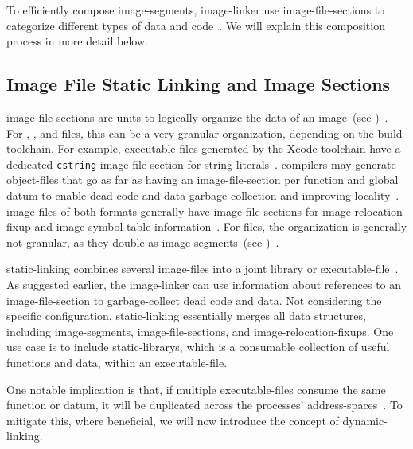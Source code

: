 To efficiently compose \glspl{image-segment}, \gls{image-linker} use \glspl{image-file-section} to categorize different types of data and code~\cite{levine2000linkers}. We will explain this composition process in more detail below.

\subsection{Image File Static Linking and Image Sections}
\label{sec:sections}

\Glspl{image-file-section} are units to logically organize the data of an \gls{image}~(see )~\cite{elf-spec,macho-spec,pe-format,levine2000linkers}. For , , and  files, this can be a very granular organization, depending on the build toolchain. For example,  \glspl{executable-file} generated by the  Xcode toolchain have a dedicated \texttt{cstring} \gls{image-file-section} for string literals~\cite{macho-spec}.  compilers may generate \glspl{object-file} that go as far as having an \gls{image-file-section} per function and global datum to enable dead code and data garbage collection and improving locality~\cite{gcc}. \Glspl{image-file} of both formats generally have \glspl{image-file-section} for \gls{image-relocation-fixup} and \gls{image-symbol} table information~\cite{elf-spec,macho-spec}. For  files, the organization is generally not granular, as they double as \glspl{image-segment}~(see )~\cite{pe-format}.

\Gls{static-linking} combines several \glspl{image-file} into a joint \gls{library} or \gls{executable-file}~\cite{levine2000linkers}. As suggested earlier, the \gls{image-linker} can use information about references to an \gls{image-file-section} to garbage-collect dead code and data. Not considering the specific configuration, \gls{static-linking} essentially merges all data structures, including \glspl{image-segment}, \glspl{image-file-section}, and \glspl{image-relocation-fixup}. One use case is to include \glspl{static-library}, which is a consumable collection of useful functions and data, within an \gls{executable-file}.

One notable implication is that, if multiple \glspl{executable-file} consume the same function or datum, it will be duplicated across the processes' \glspl{address-space}~\cite{levine2000linkers}. To mitigate this, where beneficial, we will now introduce the concept of \gls{dynamic-linking}.

